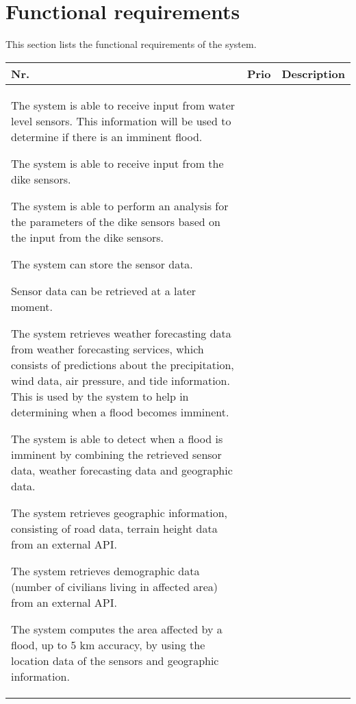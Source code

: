 \newpage
\section{Functional requirements}
\label{sec:functional-requirements}
This section lists the functional requirements of the system.

\begin{longtable}{L{0.1\textwidth} L{0.12\textwidth} L{0.78\textwidth}}
			
	\textbf{Nr.} & \textbf{Prio} & \textbf{Description} \\ \toprule \endhead
			    
	{The system is able to receive input from water level sensors. This information will be used to determine if there is an imminent flood.}
			    
	{The system is able to receive input from the dike sensors.}
				
	{The system is able to perform an analysis for the parameters of the dike sensors based on the input from the dike sensors.}
				
	{ The system can store the sensor data. }
				
	{ Sensor data can be retrieved at a later moment. }
			
	{The system retrieves weather forecasting data from weather forecasting services, which consists of predictions about the precipitation, wind data, air pressure, and tide information. This is used by the system to help in determining when a flood becomes imminent.}
			     
	{ The system is able to detect when a flood is imminent by combining the retrieved sensor data, weather forecasting data and geographic data. }
			    
	{ The system retrieves geographic information, consisting of road data, terrain height data from an external API.}
	
	{ The system retrieves demographic data (number of civilians living in affected area) from an external API. }
			        
	{ The system computes the area affected by a flood, up to 5 km accuracy, by using the location data of the sensors and geographic information. }
			    

\end{longtable}
